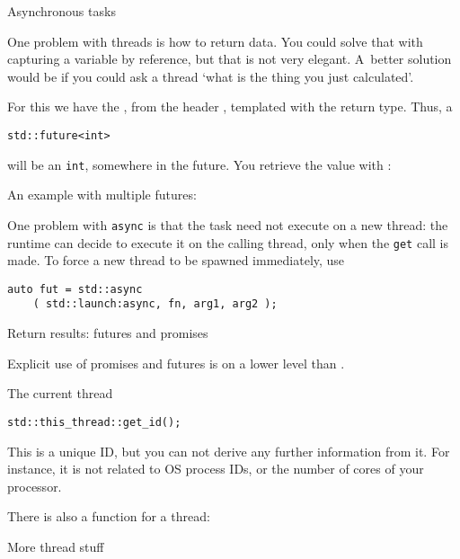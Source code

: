  {Asynchronous tasks}

One problem with threads is how to return data.
You could solve that with capturing a variable by reference,
but that is not very elegant.
A~better solution would be if you could ask a thread
`what is the thing you just calculated'.

For this we have the ,
from the header ,
templated with the return type. Thus, a
\begin{lstlisting}
std::future<int>
\end{lstlisting}
will be an \lstinline{int}, somewhere in the future.
You retrieve the value with :


An example with multiple futures:


One problem with \lstinline{async} is that the task need not execute on a new thread:
the runtime can decide to execute it on the calling thread,
only when the \lstinline{get} call is made.
To force a new thread to be spawned immediately, use
\begin{lstlisting}
auto fut = std::async
    ( std::launch:async, fn, arg1, arg2 );
\end{lstlisting}

 {Return results: futures and promises}

Explicit use of promises and futures is on a lower level than .


\begin{multicols}{2}
\end{multicols}

 {The current thread}
\label{sec:this-thread}

\begin{lstlisting}
std::this_thread::get_id();
\end{lstlisting}
This is a unique ID, but you can not derive any further information from it.
For instance, it is not related to \ac{OS} process IDs,
or the number of cores of your processor.

There is also a  function for a thread:
%

 {More thread stuff}

